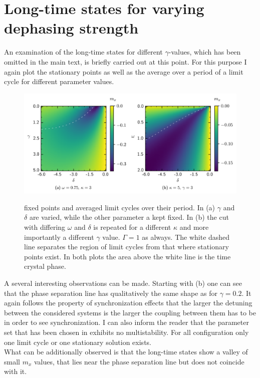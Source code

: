     \section{Long-time states for varying dephasing strength}\label{app:gamma_analysis}
    An examination of the long-time states for different $\gamma$-values, which has been omitted in the main text, is briefly carried out at this point. For this purpose I again plot the stationary points as well as the average over a period of a limit cycle for different parameter values.
    \begin{figure}[H]
        \centering
        \caption{fixed points and averaged limit cycles over their period. In (a) $\gamma$ and $\delta$ are varied, while the other parameter a kept fixed. In (b) the cut with differing $\omega$ and $\delta$ is repeated for a different $\kappa$ and more importantly a different $\gamma$ value. $\Gamma=1$ as always. The white dashed line separates the region of limit cycles from that where stationary points exist. In both plots the area above the white line is the time crystal phase.}
        \includegraphics{pictures/limit_cycle_mean_gw.png}
        \label{fig:gamma_longtime}
    \end{figure}
    A several interesting observations can be made. Starting with (b) one can see that the phase separation line has qualitatively the same shape as for $\gamma=0.2$. It again follows the property of synchronization effects that the larger the detuning between the considered systems is the larger the coupling between them has to be in order to see synchronization. I can also inform the reader that the parameter set that has been chosen in   exhibits no multistability. For all configuration only one limit cycle or one stationary solution exists. \\
    What can be additionally observed is that the long-time states show a valley of small $m_x$ values, that lies near the phase separation line but does not coincide with it. \\\\
